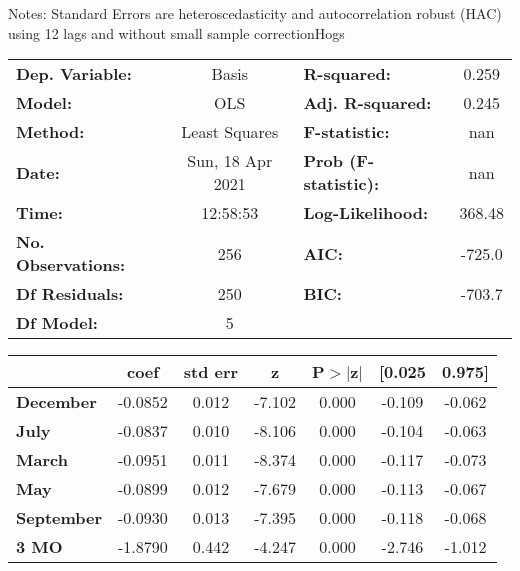 Notes: \newline
 [1] Standard Errors are heteroscedasticity and autocorrelation robust (HAC) using 12 lags and without small sample correctionHogs\begin{center}
\begin{tabular}{lclc}
\toprule
\textbf{Dep. Variable:}    &      Basis       & \textbf{  R-squared:         } &     0.259   \\
\textbf{Model:}            &       OLS        & \textbf{  Adj. R-squared:    } &     0.245   \\
\textbf{Method:}           &  Least Squares   & \textbf{  F-statistic:       } &       nan   \\
\textbf{Date:}             & Sun, 18 Apr 2021 & \textbf{  Prob (F-statistic):} &      nan    \\
\textbf{Time:}             &     12:58:53     & \textbf{  Log-Likelihood:    } &    368.48   \\
\textbf{No. Observations:} &         256      & \textbf{  AIC:               } &    -725.0   \\
\textbf{Df Residuals:}     &         250      & \textbf{  BIC:               } &    -703.7   \\
\textbf{Df Model:}         &           5      & \textbf{                     } &             \\
\bottomrule
\end{tabular}
\begin{tabular}{lcccccc}
                   & \textbf{coef} & \textbf{std err} & \textbf{z} & \textbf{P$> |$z$|$} & \textbf{[0.025} & \textbf{0.975]}  \\
\midrule
\textbf{December}  &      -0.0852  &        0.012     &    -7.102  &         0.000        &       -0.109    &       -0.062     \\
\textbf{July}      &      -0.0837  &        0.010     &    -8.106  &         0.000        &       -0.104    &       -0.063     \\
\textbf{March}     &      -0.0951  &        0.011     &    -8.374  &         0.000        &       -0.117    &       -0.073     \\
\textbf{May}       &      -0.0899  &        0.012     &    -7.679  &         0.000        &       -0.113    &       -0.067     \\
\textbf{September} &      -0.0930  &        0.013     &    -7.395  &         0.000        &       -0.118    &       -0.068     \\
\textbf{3 MO}      &      -1.8790  &        0.442     &    -4.247  &         0.000        &       -2.746    &       -1.012     \\

\end{tabular}
\end{center}
